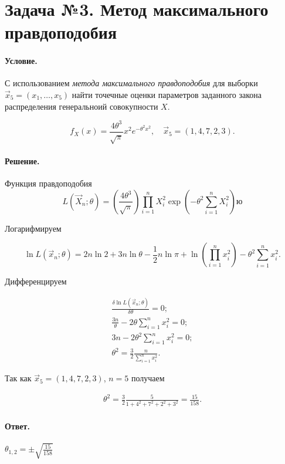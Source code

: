 
\section{Задача №3. Метод максимального правдоподобия}

\paragraph{Условие.} С использованием \emph{метода максимального правдоподобия} для выборки $\vec{x}_5 = (x_1, \dots, x_5)$ найти точечные оценки параметров заданного закона распределения генеральноий совокупности $X$.

\[
    f_X(x) = \frac{4\theta^3}{\sqrt{\pi}} x^2 e^{-\theta^2 x^2}, \quad \vec{x}_5 = (1, 4, 7, 2, 3).
\]

\paragraph{Решение.}

\noindent
Функция правдоподобия
\[
    L(\vec{X}_n; \theta) = \left( \frac{4 \theta^3}{\sqrt{\pi}} \right) \prod_{i = 1}^{n} X_i^2 \exp \left( - \theta^2 \sum_{i = 1}^n X_i^2 \right)ю
\]

\noindent
Логарифмируем

\[
    \ln L(\vec{x}_n; \theta) = 2n \ln 2 + 3n \ln \theta - \frac{1}{2} n \ln\pi + \ln\left( \prod_{i = 1}^{n} x_i^2 \right) - \theta^2 \sum_{i = 1}^n x_i^2.
\]

\noindent
Дифференцируем

\begin{align}
    \frac{\delta\ln L(\vec{x}_n; \theta)}{\delta\theta} = 0;
    \\
    \frac{3n}{\theta} - 2 \theta \sum_{i = 1}^n x_i^2 = 0;
    \\
    3n - 2\theta^2\sum_{i = 1}^n x_i^2 = 0;
    \\
    \theta^2 = \frac{3}{2}\frac{n}{\sum_{i = 1}^n x_i^2}.
\end{align}

\noindent
Так как $\vec{x}_5 = (1, 4, 7, 2, 3)$, $n = 5$ получаем

\begin{align}
\theta^2 = \frac{3}{2} \frac{5}{1 + 4^2 + 7^2 + 2^2 + 3^2} = \frac{15}{158}.
\end{align}

\paragraph{Ответ.} $\displaystyle\theta_{1, 2} = \pm \sqrt{\frac{15}{158}}$